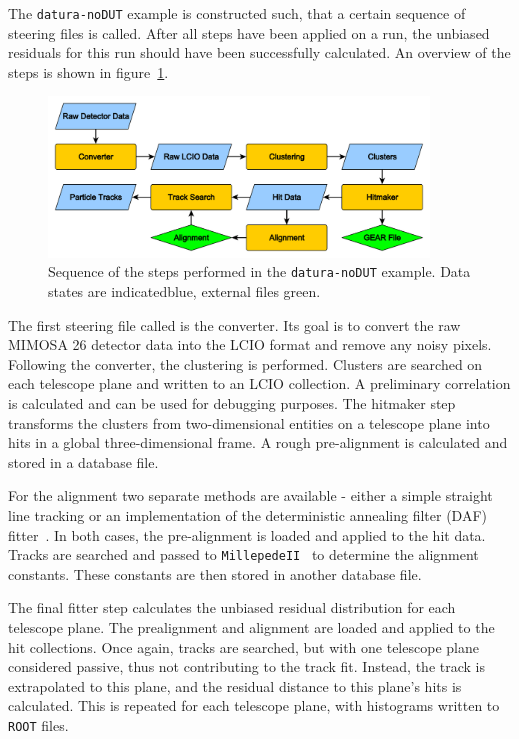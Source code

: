 The \texttt{datura-noDUT} example is constructed such, that a certain sequence of steering files is called.
After all steps have been applied on a run, the unbiased residuals for this run should have been successfully calculated.
An overview of the steps is shown in figure~\ref{fig:datura-nodutsequence}.

\begin{figure}[tbp]
\centering
\includegraphics[width=0.9\textwidth]{figures/datura-noDUT_paper.pdf}
\caption[Steps performed in the \texttt{datura-noDUT} example]{Sequence of the steps performed in the \texttt{datura-noDUT} example.
Data states are indicatedblue, external files green.}
\label{fig:datura-nodutsequence}
\end{figure}

The first steering file called is the converter.
Its goal is to convert the raw MIMOSA 26 detector data into the LCIO format and remove any noisy pixels.
Following the converter, the clustering is performed.
Clusters are searched on each telescope plane and written to an LCIO collection.
A preliminary correlation is calculated and can be used for debugging purposes.
The hitmaker step transforms the clusters from two-dimensional entities on a telescope plane into hits in a global three-dimensional frame.
A rough pre-alignment is calculated and stored in a database file.

For the alignment two separate methods are available - either a simple straight line tracking or an implementation of the deterministic annealing filter (DAF) fitter~\cite{ref:daffitter}.
In both cases, the pre-alignment is loaded and applied to the hit data.
Tracks are searched and passed to \texttt{MillepedeII}~\cite{Blobel-2006} to determine the alignment constants.
These constants are then stored in another database file.

The final fitter step calculates the unbiased residual distribution for each telescope plane.
The prealignment and alignment are loaded and applied to the hit collections.
Once again, tracks are searched, but with one telescope plane considered passive, thus not contributing to the track fit.
Instead, the track is extrapolated to this plane, and the residual distance to this plane's hits is calculated.
This is repeated for each telescope plane, with histograms written to \texttt{ROOT} files.


